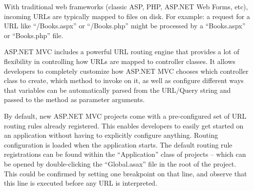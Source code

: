 With traditional web frameworks (classic ASP, PHP, ASP.NET Web Forms, etc), incoming URLs are typically mapped to files on disk.  For example: a 
request for a URL like ``/Books.aspx'' or ``/Books.php'' might be processed by a ``Books.aspx'' or ``Books.php'' file.

ASP.NET MVC includes a powerful URL routing engine that provides a lot of flexibility in controlling how URLs are mapped to controller classes.  It 
allows developers to completely customize how ASP.NET MVC chooses which controller class to create, which method to invoke on it, as well as configure
different ways that variables can be automatically parsed from the URL/Query string and passed to the method as parameter arguments.

By default, new ASP.NET MVC projects come with a pre-configured set of URL routing rules already registered.  This enables developers to easily get 
started on an application without having to explicitly configure anything. Routing configuration is loaded when the application starts. The default 
routing rule registrations can be found within the ``Application'' class of projects – which can be opened by double-clicking the ``Global.asax'' file
in the root of the project. This could be confirmed by setting one breakpoint on that line, and observe that this line is executed before any URL is 
interpreted.

